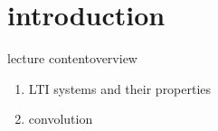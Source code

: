 


\subtitle{Part 6: LTI Systems \& Convolution}


	

    \section[intro]{introduction}
        \begin{frame}{lecture content}{overview}
            \begin{enumerate}
                \item   LTI systems and their properties
                \smallskip
                \item   convolution
            \end{enumerate}
        \end{frame}

